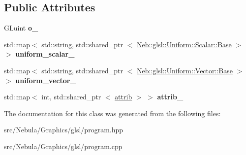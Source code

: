 \subsection*{\-Public \-Attributes}
\begin{DoxyCompactItemize}
\item 
\hypertarget{classNeb_1_1glsl_1_1program_ae5eb6255fdb52393d6ba5ef6154a6004}{\-G\-Luint {\bfseries o\-\_\-}}\label{classNeb_1_1glsl_1_1program_ae5eb6255fdb52393d6ba5ef6154a6004}

\item 
\hypertarget{classNeb_1_1glsl_1_1program_a96ae6982bdd2fe9b7609e4e8a5009733}{std\-::map$<$ std\-::string, \*
std\-::shared\-\_\-ptr\*
$<$ \hyperlink{classNeb_1_1glsl_1_1Uniform_1_1Scalar_1_1Base}{\-Neb\-::glsl\-::\-Uniform\-::\-Scalar\-::\-Base} $>$ $>$ {\bfseries uniform\-\_\-scalar\-\_\-}}\label{classNeb_1_1glsl_1_1program_a96ae6982bdd2fe9b7609e4e8a5009733}

\item 
\hypertarget{classNeb_1_1glsl_1_1program_aaa98c3730eaf9b9f02b7b9d056acb7c3}{std\-::map$<$ std\-::string, \*
std\-::shared\-\_\-ptr\*
$<$ \hyperlink{classNeb_1_1glsl_1_1Uniform_1_1Vector_1_1Base}{\-Neb\-::glsl\-::\-Uniform\-::\-Vector\-::\-Base} $>$ $>$ {\bfseries uniform\-\_\-vector\-\_\-}}\label{classNeb_1_1glsl_1_1program_aaa98c3730eaf9b9f02b7b9d056acb7c3}

\item 
\hypertarget{classNeb_1_1glsl_1_1program_ae5f072f077cff9edbac00de231068383}{std\-::map$<$ int, std\-::shared\-\_\-ptr\*
$<$ \hyperlink{classNeb_1_1glsl_1_1attrib}{attrib} $>$ $>$ {\bfseries attrib\-\_\-}}\label{classNeb_1_1glsl_1_1program_ae5f072f077cff9edbac00de231068383}

\end{DoxyCompactItemize}


\-The documentation for this class was generated from the following files\-:\begin{DoxyCompactItemize}
\item 
src/\-Nebula/\-Graphics/glsl/program.\-hpp\item 
src/\-Nebula/\-Graphics/glsl/program.\-cpp\end{DoxyCompactItemize}
